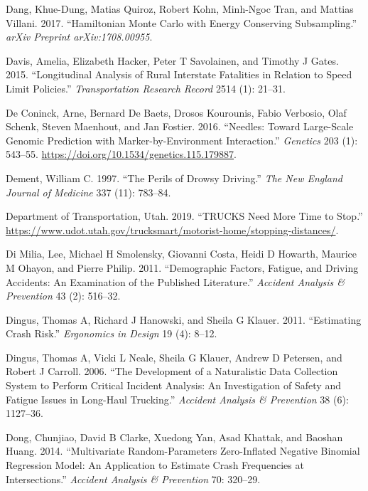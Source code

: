 \documentclass[12pt]{book}
\numberwithin{equation}{chapter}
\begin{document}
\leavevmode\hypertarget{ref-dang2017hamiltonian}{}%
Dang, Khue-Dung, Matias Quiroz, Robert Kohn, Minh-Ngoc Tran, and Mattias Villani. 2017. ``Hamiltonian Monte Carlo with Energy Conserving Subsampling.'' \emph{arXiv Preprint arXiv:1708.00955}.

\leavevmode\hypertarget{ref-davis2015longitudinal}{}%
Davis, Amelia, Elizabeth Hacker, Peter T Savolainen, and Timothy J Gates. 2015. ``Longitudinal Analysis of Rural Interstate Fatalities in Relation to Speed Limit Policies.'' \emph{Transportation Research Record} 2514 (1): 21--31.

\leavevmode\hypertarget{ref-Coninck2016}{}%
De Coninck, Arne, Bernard De Baets, Drosos Kourounis, Fabio Verbosio, Olaf Schenk, Steven Maenhout, and Jan Fostier. 2016. ``Needles: Toward Large-Scale Genomic Prediction with Marker-by-Environment Interaction.'' \emph{Genetics} 203 (1): 543--55. \url{https://doi.org/10.1534/genetics.115.179887}.

\leavevmode\hypertarget{ref-dement1997perils}{}%
Dement, William C. 1997. ``The Perils of Drowsy Driving.'' \emph{The New England Journal of Medicine} 337 (11): 783--84.

\leavevmode\hypertarget{ref-utah2019}{}%
Department of Transportation, Utah. 2019. ``TRUCKS Need More Time to Stop.'' \url{https://www.udot.utah.gov/trucksmart/motorist-home/stopping-distances/}.

\leavevmode\hypertarget{ref-di2011demographic}{}%
Di Milia, Lee, Michael H Smolensky, Giovanni Costa, Heidi D Howarth, Maurice M Ohayon, and Pierre Philip. 2011. ``Demographic Factors, Fatigue, and Driving Accidents: An Examination of the Published Literature.'' \emph{Accident Analysis \& Prevention} 43 (2): 516--32.

\leavevmode\hypertarget{ref-dingus2011estimating}{}%
Dingus, Thomas A, Richard J Hanowski, and Sheila G Klauer. 2011. ``Estimating Crash Risk.'' \emph{Ergonomics in Design} 19 (4): 8--12.

\leavevmode\hypertarget{ref-dingus2006development}{}%
Dingus, Thomas A, Vicki L Neale, Sheila G Klauer, Andrew D Petersen, and Robert J Carroll. 2006. ``The Development of a Naturalistic Data Collection System to Perform Critical Incident Analysis: An Investigation of Safety and Fatigue Issues in Long-Haul Trucking.'' \emph{Accident Analysis \& Prevention} 38 (6): 1127--36.

\leavevmode\hypertarget{ref-dong2014multivariate}{}%
Dong, Chunjiao, David B Clarke, Xuedong Yan, Asad Khattak, and Baoshan Huang. 2014. ``Multivariate Random-Parameters Zero-Inflated Negative Binomial Regression Model: An Application to Estimate Crash Frequencies at Intersections.'' \emph{Accident Analysis \& Prevention} 70: 320--29.
\end{document}
